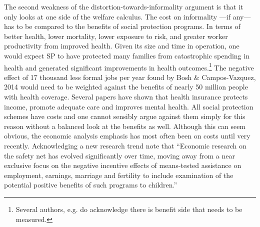 \documentclass[oneside,11pt]{article}
\begin{document}
The second weakness of the distortion-towards-informality argument is that it only looks at one side of the welfare calculus. The cost on informality ---if any--- has to be compared to the benefits of social protection programs. In terms of better health, lower mortality, lower exposure to risk, and greater worker productivity from improved health. Given its size and time in operation, one would expect SP to have protected many families from catastrophic spending in health and generated significant improvements in health outcomes.\footnote{Several authors, e.g. \cite{Levy_2008} do acknowledge there is benefit side that needs to be measured.}  The negative effect of 17 thousand less formal jobs per year found by Bosh \& Campos-Vazquez, 2014 would need to be weighted against the benefits of nearly 50 million people with health coverage. Several papers \cite{Oregon, Insurance_mortality} have shown that health insurance protects income, promote adequate care and improves mental health. All social protection schemes have costs and one cannot sensibly argue against them simply for this reason without a balanced look at the benefits as well. Although this can seem obvious, the economic analysis emphasis has most often been on costs until very recently.  Acknowledging a new research trend \cite{NBERw29754} note that ``Economic research on the safety net has evolved significantly over time, moving away from a near exclusive focus on the negative incentive effects of means-tested assistance on employment, earnings, marriage and fertility to include examination of the potential positive benefits of such programs to children.'' 

\end{document}
